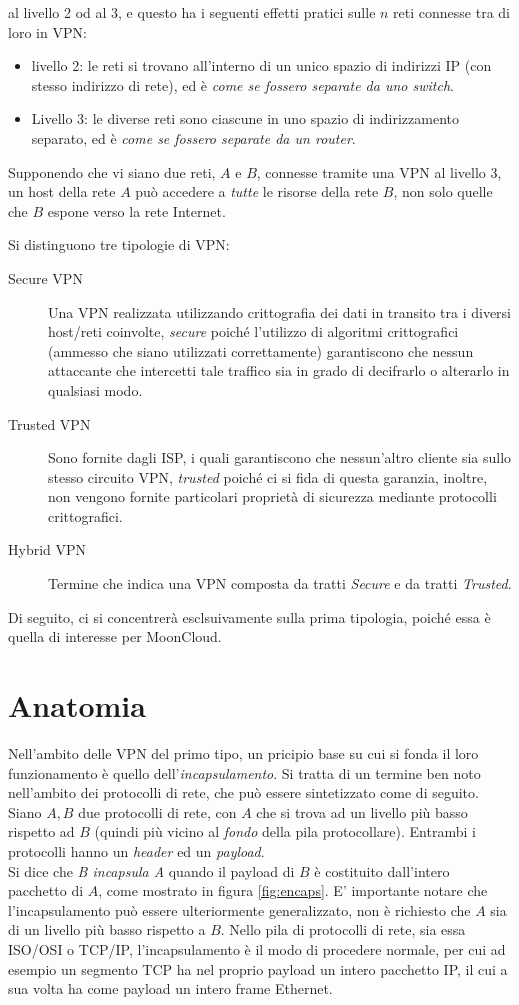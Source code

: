 al livello 2 od al 3, e questo ha i seguenti effetti pratici sulle $n$ reti connesse
tra di loro in VPN:
\begin{itemize}
  \item livello 2: le reti si trovano all'interno di un unico spazio di indirizzi IP
  (con stesso indirizzo di rete), ed è \textit{come se fossero separate da uno switch}.
  \item Livello 3: le diverse reti sono ciascune in uno spazio di indirizzamento separato,
  ed è \textit{come se fossero separate da un router}.
\end{itemize}
Supponendo che vi siano due reti, $A$ e $B$, connesse tramite una VPN al livello 3,
un host della rete $A$ può accedere a \textit{tutte} le risorse della rete $B$,
non solo quelle che $B$ espone verso la rete Internet.


Si distinguono tre tipologie di VPN:
\begin{description}
  \item[Secure VPN]Una VPN realizzata utilizzando crittografia dei dati in transito
  tra i diversi host/reti coinvolte, \textit{secure} poiché l'utilizzo di algoritmi
  crittografici (ammesso che siano utilizzati correttamente) garantiscono che nessun
  attaccante che intercetti tale traffico sia in grado di decifrarlo o alterarlo in
  qualsiasi modo.
  \item[Trusted VPN]Sono fornite dagli ISP, i quali garantiscono che nessun'altro
  cliente sia sullo stesso circuito VPN, \textit{trusted} poiché ci si fida di
  questa garanzia, inoltre, non vengono fornite particolari proprietà di sicurezza
  mediante protocolli crittografici.
  \item[Hybrid VPN]Termine che indica una VPN composta da tratti \textit{Secure}
  e da tratti \textit{Trusted}.
\end{description}
Di seguito, ci si concentrerà esclsuivamente sulla prima tipologia, poiché essa è
quella di interesse per MoonCloud.


\section{Anatomia}
Nell'ambito delle VPN del primo tipo, un pricipio base su cui si fonda il loro
funzionamento è quello dell'\textit{incapsulamento}. Si tratta di un termine
ben noto nell'ambito dei protocolli di rete, che può essere sintetizzato come
di seguito. Siano $A, B$ due protocolli di rete, con $A$ che si trova ad un livello
più basso rispetto ad $B$ (quindi più vicino al \textit{fondo} della pila
protocollare). Entrambi i protocolli hanno un \textit{header} ed un
\textit{payload}.\\
Si dice che \textit{B incapsula A} quando il payload di $B$ è costituito dall'intero
pacchetto di $A$, come mostrato in figura \ref{fig:encaps}.
E' importante notare che l'incapsulamento può essere ulteriormente generalizzato,
non è richiesto che $A$ sia di un livello più basso rispetto a $B$. Nello pila
di protocolli di rete, sia essa ISO/OSI o TCP/IP, l'incapsulamento è il modo di
procedere normale, per cui ad esempio un segmento TCP ha nel proprio payload
un intero pacchetto IP, il cui a sua volta ha come payload un intero frame Ethernet.


